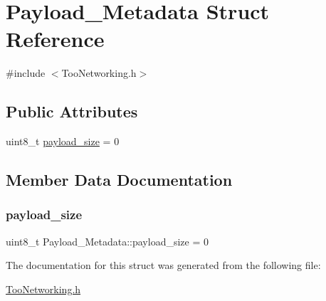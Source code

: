 \hypertarget{structPayload__Metadata}{}\section{Payload\+\_\+\+Metadata Struct Reference}
\label{structPayload__Metadata}


{\ttfamily \#include $<$Too\+Networking.\+h$>$}

\subsection*{Public Attributes}
\begin{DoxyCompactItemize}
\item 
uint8\+\_\+t \hyperlink{structPayload__Metadata_a5d517fb1e486f468bef3f42b93b6707d}{payload\+\_\+size} = 0
\end{DoxyCompactItemize}


\subsection{Member Data Documentation}
\mbox{\label{structPayload__Metadata_a5d517fb1e486f468bef3f42b93b6707d}} 
\subsubsection{\texorpdfstring{payload\+\_\+size}{payload\_size}}
{\footnotesize\ttfamily uint8\+\_\+t Payload\+\_\+\+Metadata\+::payload\+\_\+size = 0}



The documentation for this struct was generated from the following file\+:\begin{DoxyCompactItemize}
\item 
\hyperlink{TooNetworking_8h}{Too\+Networking.\+h}\end{DoxyCompactItemize}
